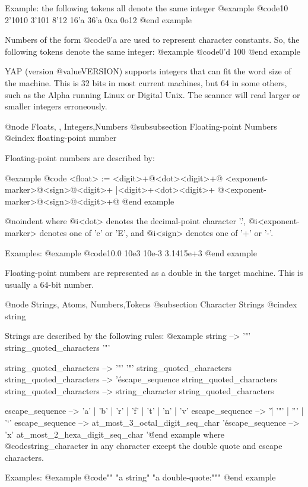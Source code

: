 {Example:
the following tokens all denote the same integer
@example
@code{10  2'1010  3'101  8'12  16'a  36'a  0xa  0o12}
@end example

Numbers of the form @code{0'a} are used to represent character
constants. So, the following tokens denote the same integer:
@example
@code{0'd  100}
@end example

YAP (version @value{VERSION}) supports integers that can fit
the word size of the machine. This is 32 bits in most current machines,
but 64 in some others, such as the Alpha running Linux or Digital
Unix. The scanner will read larger or smaller integers erroneously.

@node Floats, , Integers,Numbers
@subsubsection Floating-point Numbers
@cindex floating-point number

Floating-point numbers are described by:

@example
@code{
   <float> := <digit>+@{<dot><digit>+@}
               <exponent-marker>@{<sign>@}<digit>+
            |<digit>+<dot><digit>+
               @{<exponent-marker>@{<sign>@}<digit>+@}
}
@end example

@noindent
where @i{<dot>} denotes the decimal-point character '.',
@i{<exponent-marker>} denotes one of 'e' or 'E', and @i{<sign>} denotes
one of '+' or '-'.

Examples:
@example
@code{10.0   10e3   10e-3   3.1415e+3}
@end example

Floating-point numbers are represented as a double in the target
machine. This is usually a 64-bit number.

@node Strings, Atoms, Numbers,Tokens
@subsection Character Strings
@cindex string

Strings are described by the following rules:
@example
  string --> '"' string_quoted_characters '"'

  string_quoted_characters --> '"' '"' string_quoted_characters
  string_quoted_characters --> '\'
                          escape_sequence string_quoted_characters
  string_quoted_characters -->
                          string_character string_quoted_characters

  escape_sequence --> 'a' | 'b' | 'r' | 'f' | 't' | 'n' | 'v'
  escape_sequence --> '\' | '"' | ''' | '`'
  escape_sequence --> at_most_3_octal_digit_seq_char '\'
  escape_sequence --> 'x' at_most_2_hexa_digit_seq_char '\'
@end example
where @code{string_character} in any character except the double quote
and escape characters.

Examples:
@example
@code{""   "a string"   "a double-quote:""" }
@end example

}
